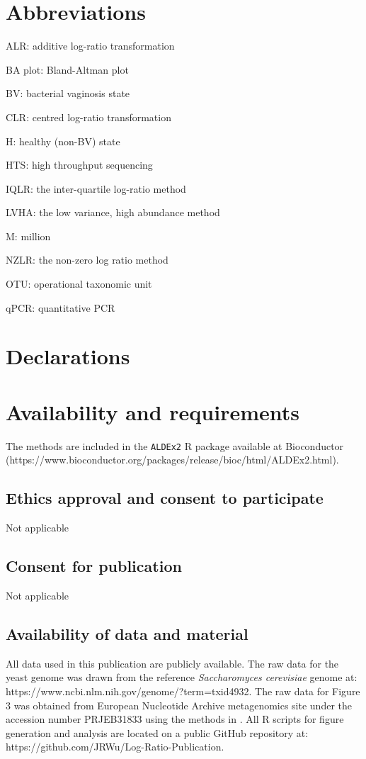 \documentclass[graybox]{svmult}
\begin{document}
\section*{Abbreviations}

\noindent ALR: additive log-ratio transformation

\noindent BA plot: Bland-Altman plot

\noindent BV: bacterial vaginosis state

\noindent CLR: centred log-ratio transformation

\noindent H: healthy (non-BV) state

\noindent HTS: high throughput sequencing

\noindent IQLR: the inter-quartile log-ratio method

\noindent LVHA: the low variance, high abundance method

\noindent M: million

\noindent NZLR: the non-zero log ratio method

\noindent OTU: operational taxonomic unit

\noindent qPCR: quantitative PCR

\section*{Declarations} 

\section*{Availability and requirements}

The methods are included in the \texttt{ALDEx2} R package available at Bioconductor (https://www.bioconductor.org/packages/release/bioc/html/ALDEx2.html). 

\subsection*{Ethics approval and consent to participate}
Not applicable

\subsection*{Consent for publication}
Not applicable

\subsection*{Availability of data and material}
All data used in this publication are publicly available. The raw data for the yeast genome was drawn from the reference \textit{Saccharomyces cerevisiae} genome at: https://www.ncbi.nlm.nih.gov/genome/?term=txid4932. The raw data for Figure 3 was obtained from European Nucleotide Archive metagenomics site under the accession number PRJEB31833 using  the  methods in \cite{Macklaim:2018aa}. All R scripts for figure generation and analysis are located on a public GitHub repository at: https://github.com/JRWu/Log-Ratio-Publication.
\end{document}
